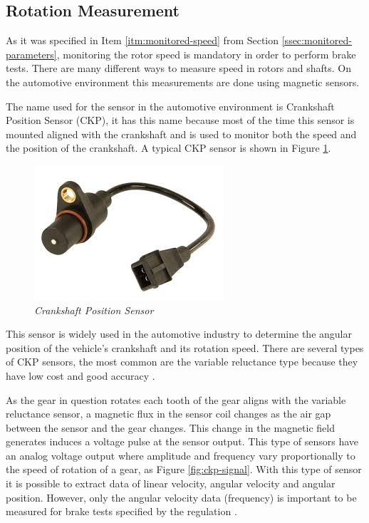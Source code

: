 \subsection{Rotation Measurement}\label{ssec:speedMeasurement}
	
	As it was specified in Item \ref{itm:monitored-speed} from Section \ref{ssec:monitored-parameters}, monitoring the rotor speed is mandatory in order to perform brake tests. There are many different ways to measure speed in rotors and shafts. On the automotive environment this measurements are done using magnetic sensors.
	\par
	The name used for the sensor in the automotive environment is Crankshaft Position Sensor (CKP), it has this name because most of the time this sensor is mounted aligned with the crankshaft and is used to monitor both the speed and the position of the crankshaft. A typical CKP sensor is shown in Figure \ref{fig-ckpReal}.

	\begin{figure}[htbp]
		\centering
		\includegraphics[width=.5\textwidth]{figuras/fig-ckp-real.jpg}
		\caption{\textit{Crankshaft Position Sensor} \cite{ckp-gm}}
		\label{fig-ckpReal}
	\end{figure}

	This sensor is widely used in the automotive industry to determine the angular position of the vehicle's crankshaft and its rotation speed. There are several types of CKP sensors, the most common are the variable reluctance type because they have low cost and good accuracy \cite{schroeder2002crankshaft}.
	\par
	As the gear in question rotates each tooth of the gear aligns with the variable reluctance sensor, a magnetic flux in the sensor coil changes as the air gap between the sensor and the gear changes. This change in the magnetic field generates induces a voltage pulse at the sensor output. This type of sensors have an analog voltage output where amplitude and frequency vary proportionally to the speed of rotation of a gear, as Figure \ref{fig:ckp-signal}. With this type of sensor it is possible to extract data of linear velocity, angular velocity and angular position. However, only the angular velocity data (frequency) is important to be measured for brake tests specified by the regulation \cite{saej2522}. 

